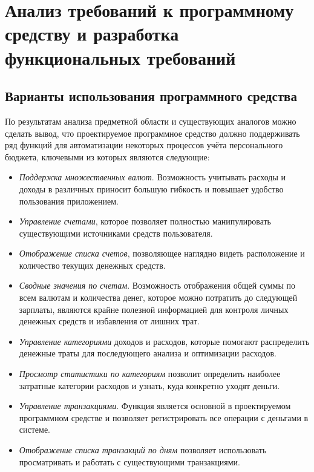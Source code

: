 \section{Анализ требований к программному средству и разработка функциональных требований}
\label{sec:domain}

\subsection{Варианты использования программного средства}
\label{sec:domain:use_cases}

По результатам анализа предметной области и существующих аналогов можно сделать вывод, что проектируемое программное средство должно поддерживать ряд функций для автоматизации некоторых процессов учёта персонального бюджета, ключевыми из которых являются следующие:

\begin{itemize}
    \item \emph{Поддержка множественных валют}.
    Возможность учитывать расходы и доходы в различных приносит большую гибкость и повышает удобство пользования приложением.
    \item \emph{Управление счетами}, которое позволяет полностью манипулировать существующими источниками средств пользователя.
    \item \emph{Отображение списка счетов}, позволяющее наглядно видеть расположение и количество текущих денежных средств.
    \item \emph{Сводные значения по счетам}.
    Возможность отображения общей суммы по всем валютам и количества денег, которое можно потратить до следующей зарплаты, являются крайне полезной информацией для контроля личных денежных средств и избавления от лишних трат.
    \item \emph{Управление категориями} доходов и расходов, которые помогают распределить денежные траты для последующего анализа и оптимизации расходов.
    \item \emph{Просмотр статистики по категориям} позволит определить наиболее затратные категории расходов и узнать, куда конкретно уходят деньги.
    \item \emph{Управление транзакциями}.
    Функция является основной в проектируемом программном средстве и позволяет регистрировать все операции с деньгами в системе.
    \item \emph{Отображение списка транзакций по дням} позволяет использовать просматривать и работать с существующими транзакциями.
\end{itemize}

